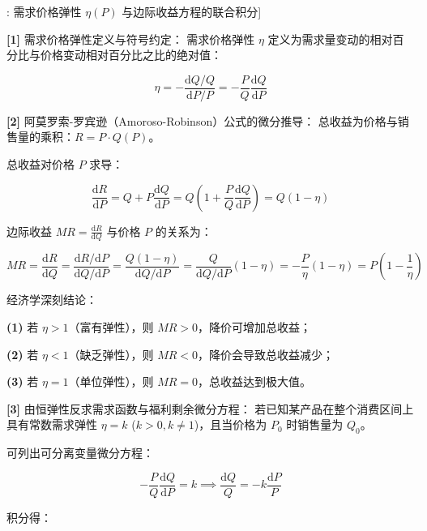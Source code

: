 \documentclass[11pt,a4paper,UTF8]{ctexart}
\begin{document}
\begin{thmbox}[模型[6]: 需求价格弹性 $\eta(P)$ 与边际收益方程的联合积分]

\textbf{[1]} 需求价格弹性定义与符号约定：
需求价格弹性 $\eta$ 定义为需求量变动的相对百分比与价格变动相对百分比之比的绝对值：


\begin{equation*}
\eta = -\frac{\mathrm{d}Q / Q}{\mathrm{d}P / P} = -\frac{P}{Q}\frac{\mathrm{d}Q}{\mathrm{d}P}
\end{equation*}


\textbf{[2]} 阿莫罗索-罗宾逊（Amoroso-Robinson）公式的微分推导：
总收益为价格与销售量的乘积：$R = P \cdot Q(P)$。

总收益对价格 $P$ 求导：


\begin{equation*}
\frac{\mathrm{d}R}{\mathrm{d}P} = Q + P \frac{\mathrm{d}Q}{\mathrm{d}P} = Q \left(1 + \frac{P}{Q}\frac{\mathrm{d}Q}{\mathrm{d}P}\right) = Q (1 - \eta)
\end{equation*}


边际收益 $MR = \frac{\mathrm{d}R}{\mathrm{d}Q}$ 与价格 $P$ 的关系为：


\begin{equation*}
MR = \frac{\mathrm{d}R}{\mathrm{d}Q} = \frac{\mathrm{d}R / \mathrm{d}P}{\mathrm{d}Q / \mathrm{d}P} = \frac{Q(1 - \eta)}{\mathrm{d}Q / \mathrm{d}P} = \frac{Q}{\mathrm{d}Q / \mathrm{d}P} (1 - \eta) = -\frac{P}{\eta}(1 - \eta) = P \left(1 - \frac{1}{\eta}\right)
\end{equation*}


经济学深刻结论：

\textbf{(1)}  若 $\eta > 1$（富有弹性），则 $MR > 0$，降价可增加总收益；

\textbf{(2)}  若 $\eta < 1$（缺乏弹性），则 $MR < 0$，降价会导致总收益减少；

\textbf{(3)}  若 $\eta = 1$（单位弹性），则 $MR = 0$，总收益达到极大值。

\textbf{[3]} 由恒弹性反求需求函数与福利剩余微分方程：
若已知某产品在整个消费区间上具有常数需求弹性 $\eta = k$ ($k > 0, k \neq 1$)，且当价格为 $P_0$ 时销售量为 $Q_0$。

可列出可分离变量微分方程：


\begin{equation*}
-\frac{P}{Q}\frac{\mathrm{d}Q}{\mathrm{d}P} = k \implies \frac{\mathrm{d}Q}{Q} = -k \frac{\mathrm{d}P}{P}
\end{equation*}


积分得：



\end{thmbox}
\end{document}
